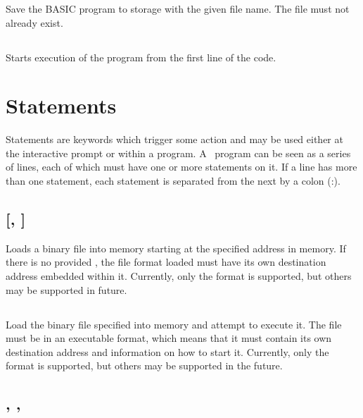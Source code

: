 \documentclass{report}
\begin{document}
    Save the BASIC program to storage with the given file name.
    The file must not already exist.
    
    \subsection*{}

    Starts execution of the program from the first line of the code.

    \section*{Statements}

    Statements are keywords which trigger some action and may be used either at the interactive prompt or within a program.
    A \BASIC\ program can be seen as a series of lines, each of which must have one or more statements on it.
    If a line has more than one statement, each statement is separated from the next by a colon (:).

    \subsection*{  [, ]}

    Loads a binary file into memory starting at the specified  address in memory. If there is no
    provided , the file format loaded must have its own destination address embedded within it.
    Currently, only the  format is supported, but others may be supported in future.

    \subsection*{ }

    Load the binary file specified into memory and attempt to execute it.
    The file must be in an executable format, which means that it must contain its own destination address
    and information on how to start it. Currently, only the  format is supported, but others
    may be supported in the future.

    \subsection*{ , , }
\end{document}
